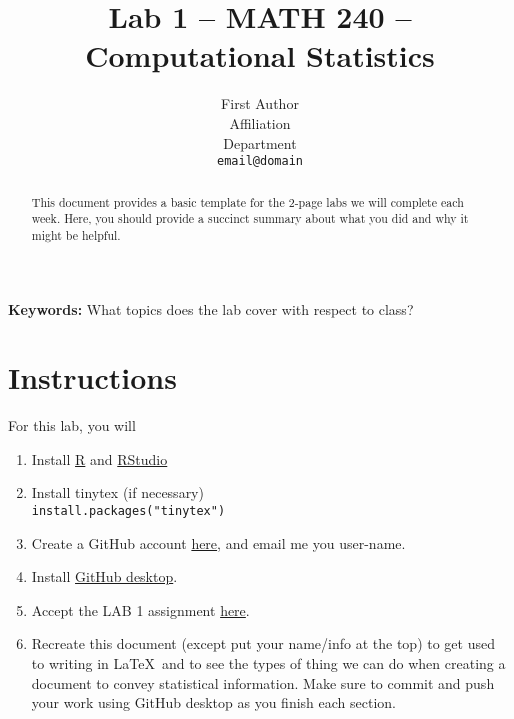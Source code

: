 \documentclass{article}\usepackage[]{graphicx}\usepackage[]{xcolor}
\begin{document}
\vspace{-1in}
\title{Lab 1 -- MATH 240 -- Computational Statistics}

\author{
  First Author \\
  Affiliation  \\
  Department  \\
  {\tt email@domain}
}

\date{}

\maketitle

\begin{multicols}{2}
\begin{abstract}
 This document provides a basic template for the 2-page labs we will complete each week. Here, you should provide a succinct summary about what you did and why it might be helpful.
\end{abstract}

\indent \textbf{Keywords:} What topics does the lab cover with respect to class? 

\section{Instructions}
For this lab, you will 
\begin{enumerate}[1.]\itemsep0em
\item Install  \href{https://cran.rstudio.com/}{R} and \href{https://posit.co/download/rstudio-desktop/}{RStudio}
\item Install tinytex (if necessary)
\\ {\tt install.packages("tinytex")}
\item Create a GitHub account \href{https://github.com/}{here}, and email me you user-name.
\item Install \href{https://github.com/apps/desktop}{GitHub desktop}.
\item Accept the LAB 1 assignment \href{https://classroom.github.com/assignment-invitations/49ec7c38806e92bfef8bf3094b9b11d3}{here}.
\item Recreate this document (except put your name/info at the top) to get used to writing in \LaTeX~and to see the types of thing we can do when creating a document to convey statistical information. Make sure to commit and push your work using GitHub desktop as you finish each section. 
\end{enumerate}


\end{multicols}
\end{document}
